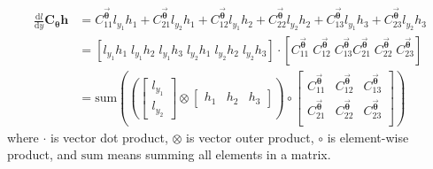 \documentclass{article}
\newcommand{\diff}{\mathrm{d}}
\begin{document}
\begin{align*}
    \frac{\diff l}{\diff y}\mathbf{C}_{\boldsymbol{\theta}}\mathbf{h} 
    &= C_{11}^{\Vec{\boldsymbol{\theta}}}l_{y_1}h_1+C_{21}^{\Vec{\boldsymbol{\theta}}}l_{y_2}h_1+C_{12}^{\Vec{\boldsymbol{\theta}}}l_{y_1}h_2+C_{22}^{\Vec{\boldsymbol{\theta}}}l_{y_2}h_2+C_{13}^{\Vec{\boldsymbol{\theta}}}l_{y_1}h_3+C_{23}^{\Vec{\boldsymbol{\theta}}}l_{y_2}h_3\\
    &= [
        l_{y_1}h_1 \; l_{y_1}h_2 \; l_{y_1}h_3 \; l_{y_2}h_1 \; l_{y_2}h_2 \; l_{y_2}h_3
        ]
        \cdot 
        [
        C_{11}^{\Vec{\boldsymbol{\theta}}} \; C_{12}^{\Vec{\boldsymbol{\theta}}} \; C_{13}^{\Vec{\boldsymbol{\theta}}}
        C_{21}^{\Vec{\boldsymbol{\theta}}} \; C_{22}^{\Vec{\boldsymbol{\theta}}} \; C_{23}^{\Vec{\boldsymbol{\theta}}}
        ]\\
    &= \mathrm{sum}\left( (\begin{bmatrix}
        l_{y_1}\\
        l_{y_2}
        \end{bmatrix}
        \otimes 
        \begin{bmatrix}
        h_1 & h_2 & h_3
        \end{bmatrix})
        \circ
        \begin{bmatrix}
        C_{11}^{\Vec{\boldsymbol{\theta}}} & C_{12}^{\Vec{\boldsymbol{\theta}}} & C_{13}^{\Vec{\boldsymbol{\theta}}}\\
        C_{21}^{\Vec{\boldsymbol{\theta}}} & C_{22}^{\Vec{\boldsymbol{\theta}}} & C_{23}^{\Vec{\boldsymbol{\theta}}}\\
        \end{bmatrix}
        \right)
\end{align*}
where $\cdot$ is vector dot product, $\otimes$ is vector outer product, $\circ$ is element-wise product, and $\mathrm{sum}$ means summing all elements in a matrix.
\end{document}
